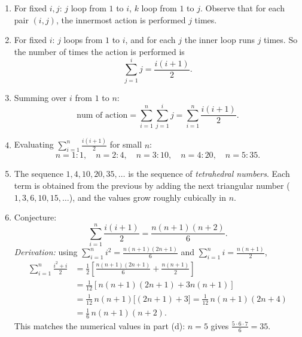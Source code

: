 \begin{solbox}[long]
\begin{solution}
    \begin{enumerate}[label=(\alph*)]
    \item For fixed $i,j$: $j$ loop from $1$ to $i$, $k$ loop from $1$ to
        $j$. Observe that for each pair $(i,j)$, the innermost action is
        performed $j$ times.

    \item For fixed $i$: $j$ loops from $1$ to $i$, and for each $j$ the
        inner loop runs $j$ times. So the number of times the action is
        performed is
        \[
            \sum_{j=1}^{i} j = \frac{i(i+1)}{2}.
        \]

    \item Summing over $i$ from $1$ to $n$:
        \[
            \text{num of action} = \sum_{i=1}^{n}\sum_{j=1}^{i} j
            = \sum_{i=1}^{n} \frac{i(i+1)}{2}.
        \]

    \item Evaluating $\displaystyle\sum_{i=1}^{n}\frac{i(i+1)}{2}$ for
        small $n$:
        \[
            n=1: 1, \quad n=2: 4, \quad n=3: 10, \quad n=4: 20, \quad
            n=5: 35.
        \]

    \item The sequence $1,4,10,20,35,\dots$ is the sequence of
        \emph{tetrahedral numbers}. Each term is obtained from the
        previous by adding the next triangular number
        ($1,3,6,10,15,\dots$), and the values grow roughly cubically in
        $n$.

    \item Conjecture:
        \[
            \sum_{i=1}^{n}\frac{i(i+1)}{2} = \frac{n(n+1)(n+2)}{6}.
        \]
        \emph{Derivation:} using $\displaystyle\sum_{i=1}^n i^2 =
        \frac{n(n+1)(2n+1)}{6}$ and $\displaystyle\sum_{i=1}^n i =
        \frac{n(n+1)}{2}$,
        \begin{align*}
            \sum_{i=1}^n \frac{i^2+i}{2}
            &= \frac12\left[\frac{n(n+1)(2n+1)}{6}
                + \frac{n(n+1)}{2}\right] \\
            &= \frac{1}{12}\left[n(n+1)(2n+1) + 3n(n+1)\right] \\
            &= \frac{1}{12}\,n(n+1)\big[(2n+1)+3\big]
                = \frac{1}{12}\,n(n+1)(2n+4) \\
            &= \frac{1}{6}\,n(n+1)(n+2).
        \end{align*}
        This matches the numerical values in part (d): $n=5$ gives
        $\frac{5\cdot6\cdot7}{6}=35$.\ \checkmark


\end{enumerate}
\end{solution}
\end{solbox}
